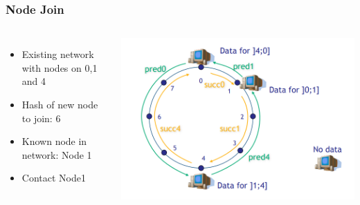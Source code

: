 \begin{frame}
    \frametitle{Node Join}
    \begin{columns}
        \begin{itemize}
            \item Existing network with nodes on 0,1 and 4
            \item Hash of new node to join: 6
            \item Known node in network: Node 1
            \item Contact Node1
        \end{itemize}
            \includegraphics[scale=0.26]{figures/chord0.png}
    \end{columns}
 \end{frame}

